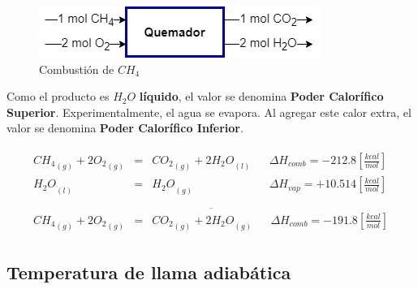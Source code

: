     \begin{multicols}{2}
        \begin{figure}[H]
            \caption{Combustión de \(CH_{4}\)}
            \label{fig:com_met}
            \includegraphics[width=\textwidth]{img/esquemas/combustion_metano.png}
        \end{figure}
        
        Como el producto es \(H_{2}O\) \textbf{líquido}, el valor se denomina \textbf{Poder Calorífico Superior}. Experimentalmente, el agua se evapora. Al agregar este calor extra, el valor se denomina \textbf{Poder Calorífico Inferior}.
    \end{multicols}
    
    \[\begin{matrix}
        \begin{matrix}
            {CH_{4}}_{(g)} + 2{O_{2}}_{(g)} & = & {CO_{2}}_{(g)} + 2{H_{2}O}_{(l)} &  & \Delta H_{comb}=-212.8 \left [ \frac{kcal}{mol} \right ] \\ 
            {H_{2}O}_{(l)} & = & {H_{2}O}_{(g)} &  & \Delta H_{vap}=+10.514 \left [ \frac{kcal}{mol} \right ]\\
        \end{matrix} \\
        \overline{\begin{matrix}
            {CH_{4}}_{(g)} + 2{O_{2}}_{(g)} & = & {CO_{2}}_{(g)} + 2{H_{2}O}_{(g)} &  & \Delta H_{comb}=-191.8 \left [ \frac{kcal}{mol} \right ]
        \end{matrix}}
    \end{matrix}\]
    
    \subsection{Temperatura de llama adiabática}
    
